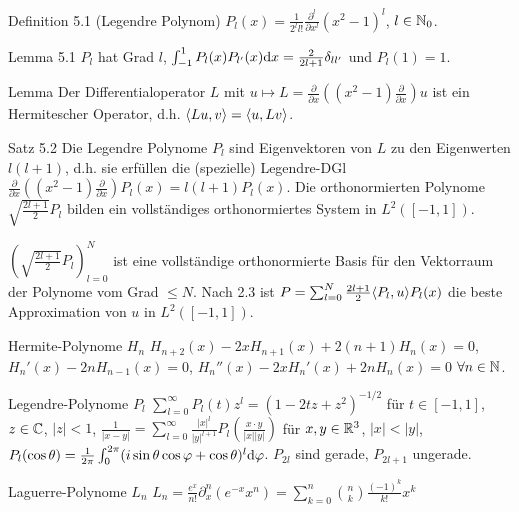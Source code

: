 \begin{namedtheorem}{Definition 5.1 (Legendre Polynom)}
  $P_l(x) = \frac1{2^ll!}\frac{\partial^l}{\partial x^l} (x^2-1)^l$, $l\in\mathbb{N}_0$.
\end{namedtheorem}

\begin{namedtheorem}{Lemma 5.1}
  $P_l$ hat Grad $l$, $\int_{-1}^1 P_l(x)P_{l'}(x)\mathrm{d} x=\frac2{2l+1}\delta_{ll'}$ und $P_l(1)=1$.
\end{namedtheorem}

\begin{namedtheorem}{Lemma}
  Der Differentialoperator $L$ mit $u\mapsto L=\frac{\partial}{\partial x}\left((x^2-1)\frac{\partial}{\partial x}\right) u$ ist ein Hermitescher Operator, d.h. $\langle Lu,v \rangle = \langle u,Lv \rangle$.
\end{namedtheorem}

\begin{namedtheorem}{Satz 5.2}
  Die Legendre Polynome $P_l$ sind Eigenvektoren von $L$ zu den Eigenwerten $l(l+1)$, d.h. sie erfüllen die (spezielle) Legendre-DGl $\frac{\partial}{\partial x}\left((x^2-1)\frac{\partial}{\partial x}\right) P_l(x) = l(l+1)P_l(x)$. Die orthonormierten Polynome $\sqrt{\frac{2l+1}2}P_l$ bilden ein vollständiges orthonormiertes System in $L^2([-1,1])$.
\end{namedtheorem}

$(\sqrt{\frac{2l+1}2}P_l)^N_{l=0}$ ist eine vollständige orthonormierte Basis für den Vektorraum der Polynome vom Grad $\leq N$. Nach 2.3 ist $P=\sum_{l=0}^N\frac{2l+1}2\langle P_l,u \rangle P_l(x)$ die beste Approximation von $u$ in $L^2([-1,1])$.

\begin{namedtheorem}{Hermite-Polynome $H_n$}
  $H_{n+2}(x)-2xH_{n+1}(x)+2(n+1)H_n(x)=0$, 
  $H_n'(x)-2nH_{n-1}(x)=0$, 
  $H_n''(x)-2xH_n'(x)+2nH_n(x)=0$ $\forall n\in\mathbb{N}$.
\end{namedtheorem}

\begin{namedtheorem}{Legendre-Polynome $P_l$}
  $\sum_{l=0}^{\infty}P_l(t)z^l=(1-2tz+z^2)^{-1/2}$ für $t\in[-1,1]$, $z\in\mathbb{C}$, $|z|<1$,
  $\frac1{|x-y|}=\sum_{l=0}^{\infty}\frac{|x|^l}{|y|^{l+1}}P_l\left(\frac{x\cdot y}{|x||y|}\right)$ für $x,y\in\mathbb{R}^3$, $|x|<|y|$,
  $P_l(\cos\theta)=\frac1{2\pi}\int_0^{2\pi}(i\sin\theta\cos\varphi+\cos\theta)^l\mathrm{d} \varphi$. $P_{2l}$ sind gerade, $P_{2l+1}$ ungerade.
\end{namedtheorem}

\begin{namedtheorem}{Laguerre-Polynome $L_n$}
  $L_n=\frac{e^x}{n!}\partial_x^n(e^{-x}x^n)=\sum_{k=0}^n\binom{n}{k}\frac{(-1)^k}{k!}x^k$
\end{namedtheorem}

